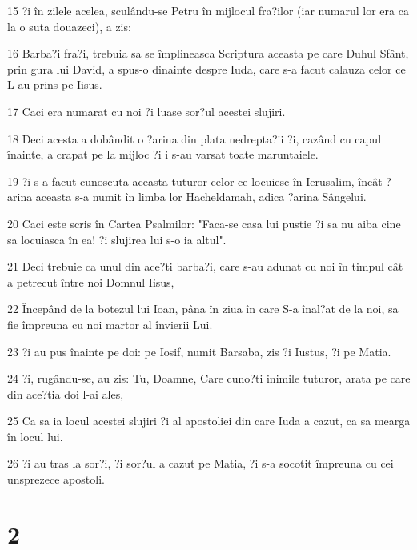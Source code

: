 \par 15 ?i în zilele acelea, sculându-se Petru în mijlocul fra?ilor (iar numarul lor era ca la o suta douazeci), a zis:
\par 16 Barba?i fra?i, trebuia sa se împlineasca Scriptura aceasta pe care Duhul Sfânt, prin gura lui David, a spus-o dinainte despre Iuda, care s-a facut calauza celor ce L-au prins pe Iisus.
\par 17 Caci era numarat cu noi ?i luase sor?ul acestei slujiri.
\par 18 Deci acesta a dobândit o ?arina din plata nedrepta?ii ?i, cazând cu capul înainte, a crapat pe la mijloc ?i i s-au varsat toate maruntaiele.
\par 19 ?i s-a facut cunoscuta aceasta tuturor celor ce locuiesc în Ierusalim, încât ?arina aceasta s-a numit în limba lor Hacheldamah, adica ?arina Sângelui.
\par 20 Caci este scris în Cartea Psalmilor: "Faca-se casa lui pustie ?i sa nu aiba cine sa locuiasca în ea! ?i slujirea lui s-o ia altul".
\par 21 Deci trebuie ca unul din ace?ti barba?i, care s-au adunat cu noi în timpul cât a petrecut între noi Domnul Iisus,
\par 22 Începând de la botezul lui Ioan, pâna în ziua în care S-a înal?at de la noi, sa fie împreuna cu noi martor al învierii Lui.
\par 23 ?i au pus înainte pe doi: pe Iosif, numit Barsaba, zis ?i Iustus, ?i pe Matia.
\par 24 ?i, rugându-se, au zis: Tu, Doamne, Care cuno?ti inimile tuturor, arata pe care din ace?tia doi l-ai ales,
\par 25 Ca sa ia locul acestei slujiri ?i al apostoliei din care Iuda a cazut, ca sa mearga în locul lui.
\par 26 ?i au tras la sor?i, ?i sor?ul a cazut pe Matia, ?i s-a socotit împreuna cu cei unsprezece apostoli.

\chapter{2}


